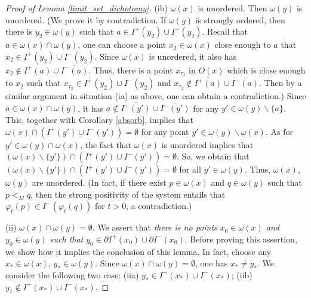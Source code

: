 \documentclass[10pt,a4paper]{amsart}
\begin{document}
\begin{proof}[Proof of Lemma \ref{limit_set_dichotomy}]
    
    (ib) $\omega(x)$ is unordered. Then $\omega(y)$ is unordered. (We prove it by contradiction. If $\omega(y)$ is strongly ordered, then there is $y_2\in \omega(y)$ such that $a\in I^{+}(y_2)\cup I^{-}(y_2)$. Recall that $a\in \omega(x)\cap\omega(y)$, one can choose a point $x_2\in \omega(x)$ close enough to $a$ that $x_2\in I^{+}(y_2)\cup I^{-}(y_2)$. Since $\omega(x)$ is unordered, it also has $x_2\notin\overline{I^{+}(a)}\cup \overline{I^{-}(a)}$. Thus, there is a point $x_{\tau_2}$ in $O(x)$ which is close enough to $x_2$ such that $x_{\tau_2}\in I^{+}(y_2)\cup I^{-}(y_2)$ and $x_{\tau_2}\notin\overline{I^{+}(a)}\cup \overline{I^{-}(a)}$. Then by a similar argument in situation (ia) as above, one can obtain a contradiction.) Since $a\in \omega(x)\cap\omega(y)$, it has $a\notin \overline{I^{+}(y')}\cup \overline{I^{-}(y')}$ for any $y'\in \omega(y)\backslash\{a\}$. This, together with Corollary \ref{absorb}, implies that $\omega(x) \cap (I^{+}(y')\cup I^{-}(y'))=\emptyset$ for any point $y'\in \omega(y)\backslash \omega(x)$. As for $y'\in \omega(y)\cap \omega(x)$, the fact that $\omega(x)$ is unordered implies that $(\omega(x)\backslash \{y'\}) \cap (I^{+}(y')\cup I^{-}(y'))=\emptyset$. So, we obtain that $(\omega(x)\backslash \{y'\}) \cap (I^{+}(y')\cup I^{-}(y'))=\emptyset$ for all $y'\in \omega(y)$. Thus, $\omega(x)$, $\omega(y)$ are unordered. (In fact, if there exist $p\in \omega(x)$ and $q\in \omega(y)$ such that $p<_M q$, then the strong positivity of the system entails that $\varphi_{t}(p)\in I^{-}(\varphi_{t}(q))$ for $t>0$, a contradiction.)

    (ii) $\omega(x)\cap\omega(y)=\emptyset$. We assert that \emph{there is no points $x_{0}\in\omega(x)$ and $y_{0}\in\omega(y)$ such that $y_{0}\in \partial I^{+}(x_{0})\cup \partial I^{-}(x_{0})$}. 
	Before proving this assertion, we show how it implies the conclusion of this lemma.
	In fact, choose any $x_*\in\omega(x)$, $y_*\in\omega(y)$. Since $\omega(x)\cap\omega(y)=\emptyset$, one has $x_*\neq y_*$. We consider the following two case:
	(iia) $y_*\in I^{+}(x_*)\cup I^{-}(x_*)$; (iib) $y_1\notin I^{+}(x_*)\cup I^{-}(x_*)$.
		

\end{proof}
\end{document}

